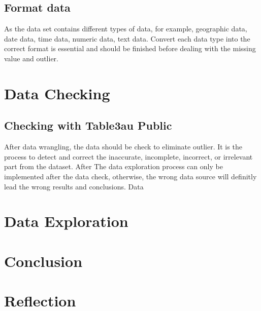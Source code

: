 \documentclass[11pt]{article}
\theoremstyle{definition}
\begin{document}
\subsection{Format data}
As the data set contains different types of data, for example, geographic data, date data, time data, numeric data, text data. Convert each data type into the correct format is essential and should be finished before dealing with the missing value and outlier. 

\section{Data Checking}
\label{dataChecking}
\subsection{Checking with Table3au Public}
After data wrangling, the data should be check to eliminate outlier. It is the process to detect and correct the inaccurate, incomplete, incorrect, or irrelevant part from the dataset. After 
The data exploration process can only be implemented after the data check, otherwise, the wrong data source will definitly lead the wrong results and conclusions. Data 

\section{Data Exploration}
\label{dataExploration}


\section{Conclusion}

\section{Reflection}
\end{document}
